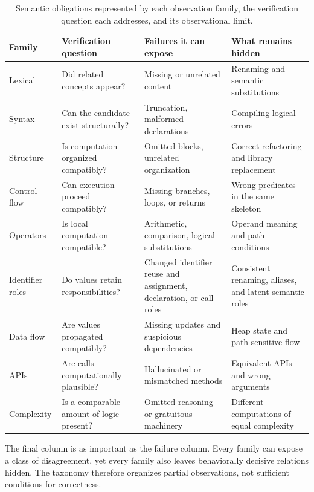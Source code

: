 \documentclass[conference]{IEEEtran}
\begin{document}
\begin{table}[t]
\centering
\caption{Semantic obligations represented by each observation family, the verification question each addresses, and its observational limit.}
\label{tab:obligations}
\begin{tabular}{@{}p{}p{}p{}p{}@{}}
\toprule
Family & Verification question & Failures it can expose & What remains hidden \\
\midrule
Lexical & Did related concepts appear? & Missing or unrelated content & Renaming and semantic substitutions \\
Syntax & Can the candidate exist structurally? & Truncation, malformed declarations & Compiling logical errors \\
Structure & Is computation organized compatibly? & Omitted blocks, unrelated organization & Correct refactoring and library replacement \\
Control flow & Can execution proceed compatibly? & Missing branches, loops, or returns & Wrong predicates in the same skeleton \\
Operators & Is local computation compatible? & Arithmetic, comparison, logical substitutions & Operand meaning and path conditions \\
Identifier roles & Do values retain responsibilities? & Changed identifier reuse and assignment, declaration, or call roles & Consistent renaming, aliases, and latent semantic roles \\
Data flow & Are values propagated compatibly? & Missing updates and suspicious dependencies & Heap state and path-sensitive flow \\
APIs & Are calls computationally plausible? & Hallucinated or mismatched methods & Equivalent APIs and wrong arguments \\
Complexity & Is a comparable amount of logic present? & Omitted reasoning or gratuitous machinery & Different computations of equal complexity \\
\bottomrule
\end{tabular}
\end{table}

The final column is as important as the failure column. Every family can expose a class of disagreement, yet every family also leaves behaviorally decisive relations hidden. The taxonomy therefore organizes partial observations, not sufficient conditions for correctness.
\end{document}
